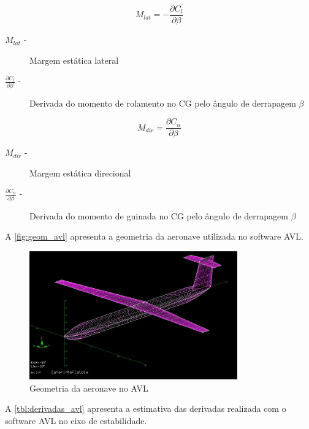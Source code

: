 \begin{equation}
  M_{lat} = - \frac{\partial C_l}{\partial \beta}
\end{equation}

\begin{description}
\item[$M_{lat}$  -] Margem estática lateral
\item[$\frac{\partial C_l}{\partial \beta}$ -] Derivada do momento de rolamento no CG pelo ângulo de derrapagem $\beta$
\end{description}

\vspace{1cm}

\begin{equation}
  M_{dir} = \frac{\partial C_n}{\partial \beta}
\end{equation}

\begin{description}
\item[$M_{dir}$  -] Margem estática direcional
\item[$\frac{\partial C_n}{\partial \beta}$ -] Derivada do momento de guinada no CG pelo ângulo de derrapagem $\beta$
\end{description}

\vspace{1cm}

A \autoref{fig:geom_avl} apresenta a geometria da aeronave utilizada no software AVL.

\begin{figure}[H]
\centering
\includegraphics[width=0.8\textwidth]{images/parte4/avl.JPG}
\caption[Geometria da aeronave no AVL]{Geometria da aeronave no AVL}
\label{fig:geom_avl}
\end{figure}

A \autoref{tbl:derivadas_avl} apresenta a estimativa das derivadas realizada com o software AVL no eixo de estabilidade.

